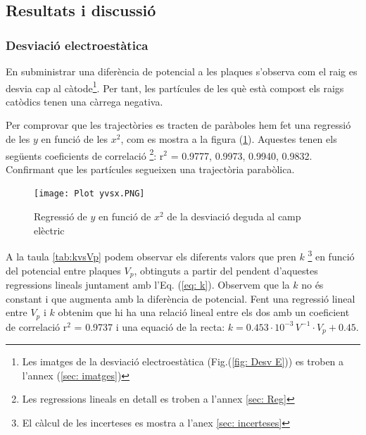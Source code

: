 \documentclass[11pt]{article}
\numberwithin{equation}{section}
\numberwithin{figure}{section}
\numberwithin{table}{section}
\begin{document}
\newpage
\subsection{Resultats i discussió}

\subsubsection{Desviació electroestàtica}\label{sec: desv_electr}

En subministrar una diferència de potencial a les plaques s'observa com el raig es desvia cap al càtode\footnote{Les imatges de la desviació electroestàtica (Fig.(\ref{fig: Desv E})) es troben a l'annex (\ref{sec: imatges}) }. Per tant, les partícules de les què està compost els raigs catòdics tenen una càrrega negativa.

 Per comprovar que les trajectòries es tracten de paràboles hem fet una regressió de les $y$ en funció de les $x^2$, com es mostra a la figura (\ref{fig: Regressió Desv E}). Aquestes tenen els següents coeficients de correlació \footnote{Les regressions lineals en detall es troben a l'annex \ref{sec: Reg}}:
 r$^2$ = 0.9777, 0.9973, 0.9940, 0.9832. Confirmant que les partícules segueixen una trajectòria parabòlica.
\begin{figure}[h]
    \centering
    \begin{minipage}{0.75\textwidth}
    \centering
        \texttt{[image: Plot yvsx.PNG]}
        \caption{Regressió de $y$ en funció de $x^2$  de la desviació deguda al camp elèctric}
        \label{fig: Regressió Desv E}
    \end{minipage}
\end{figure}

A la taula \ref{tab:kvsVp} podem observar els diferents valors que pren $k$ \footnote{El càlcul de les incerteses es mostra a l'anex \ref{sec: incerteses}} en funció del potencial entre plaques $V_p$, obtinguts a partir del pendent d'aquestes regressions lineals juntament amb l'Eq. (\ref{eq: k}). Observem que la $k$ no és constant i que augmenta amb la diferència de potencial. Fent una regressió lineal entre $V_p$ i $k$ obtenim que hi ha una relació lineal entre els dos amb un coeficient de correlació r$^2$ = 0.9737 i una equació de la recta: $k = 0.453 \cdot 10^{-3}\, V^{-1}  \cdot V_p + 0.45$.
\end{document}
